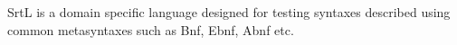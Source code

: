 SrtL is a domain specific language designed for testing syntaxes described using 
common metasyntaxes such as Bnf, Ebnf, Abnf etc. 